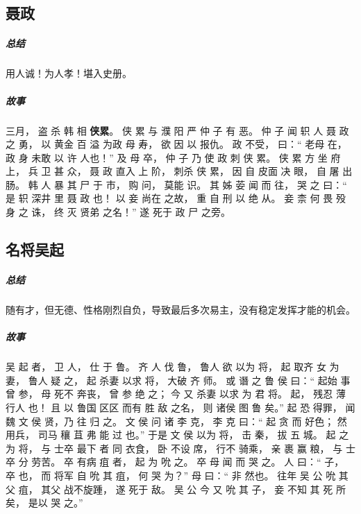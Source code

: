 \documentclass[UTF8,a4paper,8pt]{ctexbook}
\begin{document}
		\subsection{聂政}
			\subparagraph{总结}用人诚！为人孝！堪入史册。
			
			\subparagraph{故事}
				三月， 盗 杀 韩 相 \textbf{侠累}。 侠 累 与 濮 阳 严 仲 子 有 恶。 仲 子 闻 轵 人 聂 政 之 勇， 以 黄金 百 溢 为政 母 寿， 欲 因 以 报仇。 政 不受， 曰：“ 老母 在， 政 身 未敢 以 许 人也！” 及 母 卒， 仲 子 乃 使 政 刺 侠 累。 侠 累 方 坐 府上， 兵 卫 甚 众， 聂 政 直入 上 阶， 刺杀 侠 累， 因 自 皮面 决 眼， 自 屠 出 肠。 韩 人 暴 其 尸 于 市， 购 问， 莫能 识。 其 姊 荌 闻 而 往， 哭 之 曰：“ 是 轵 深井 里 聂 政 也！ 以 妾 尚在 之故， 重 自 刑 以 绝 从。 妾 柰 何 畏 殁 身 之 诛， 终 灭 贤弟 之名！” 遂 死于 政 尸 之旁。
			
						
		\subsection{名将吴起}
			\subparagraph{总结}随有才，但无德、性格刚烈自负，导致最后多次易主，没有稳定发挥才能的机会。
			
			\subparagraph{故事}
				吴 起 者， 卫 人， 仕 于 鲁。 齐 人 伐 鲁， 鲁人 欲 以为 将， 起 取齐 女 为妻， 鲁人 疑 之， 起 杀妻 以求 将， 大破 齐 师。 或 谮 之 鲁 侯 曰：“ 起始 事 曾 参， 母 死不 奔丧， 曾 参 绝 之； 今 又 杀妻 以求 为 君 将。 起， 残忍 薄 行人 也！ 且 以 鲁国 区区 而有 胜 敌 之名， 则 诸侯 图 鲁 矣。” 起 恐 得罪， 闻 魏 文 侯 贤，乃 往 归 之。 文 侯 问 诸 李 克， 李 克 曰：“ 起 贪 而 好色； 然 用兵， 司马 穰 苴 弗 能 过 也。” 于是 文 侯 以为 将， 击 秦， 拔 五 城。 起 之为 将， 与 士卒 最下 者 同 衣食， 卧 不设 席， 行不 骑乘， 亲 裹 赢 粮， 与 士卒 分 劳苦。 卒 有病 疽 者， 起 为 吮 之。 卒 母 闻 而 哭 之。 人 曰：“ 子， 卒 也， 而 将军 自 吮 其 疽， 何 哭 为？” 母 曰：“ 非 然也。 往年 吴 公 吮 其父 疽， 其父 战不旋踵， 遂 死于 敌。 吴 公 今 又 吮 其 子， 妾 不知 其 死 所 矣， 是以 哭 之。”
	
\end{document}
